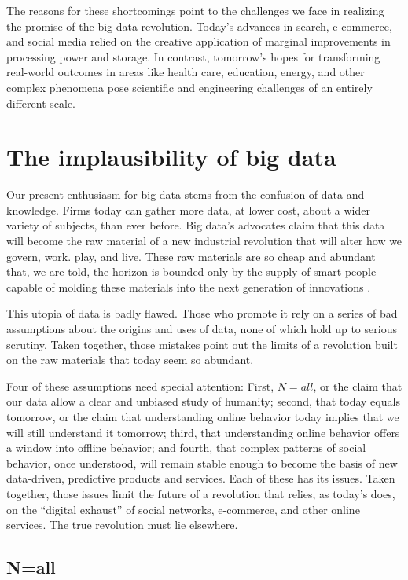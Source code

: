 \documentclass[12pt]{article}
\begin{document}
The reasons for these shortcomings point to the challenges we face in
realizing the promise of the big data revolution. Today's advances in
search, e-commerce, and social media relied on the creative
application of marginal improvements in processing power and
storage. In contrast, tomorrow's hopes for transforming real-world
outcomes in areas like health care, education, energy, and other
complex phenomena pose scientific and engineering challenges of an
entirely different scale. 


\section{The implausibility of big data}
\label{sec:convention-reality}


Our present enthusiasm for big data stems from the confusion of data
and knowledge. Firms today can gather more data, at lower cost, about
a wider variety of subjects, than ever before. Big data's
advocates claim that this data will become the raw material of a new
industrial revolution that will alter how we govern, work. play, and
live. These raw materials are so cheap and abundant that, we are told,
the horizon is bounded only by the supply of smart people capable of
molding these materials into
the next generation of innovations \citep{mckinsey2011}. 

This utopia of data is badly flawed. Those who promote it rely on a
series of bad assumptions about the origins and uses of data, none of
which hold up to serious scrutiny. Taken together, those mistakes
point out the limits of a revolution built on the raw materials that
today seem so abundant. 

Four of these assumptions need special attention: First, $N=all$, or the claim
that our data allow a clear and unbiased study of humanity; second,
that today equals tomorrow, or the claim that understanding online
behavior today implies that we will still understand it tomorrow;
third, that understanding online behavior offers a window into offline
behavior; and fourth, that complex patterns of social behavior, once
understood, will remain stable enough to become the basis of new
data-driven, predictive products and services. Each of these has its
issues. Taken together, those issues limit the future of a revolution
that relies, as today's does, on the ``digital exhaust'' of social
networks, e-commerce, and other online services. The true revolution
must lie elsewhere. 

\subsection{N=all}
\label{sec:n-equals-all}
\end{document}
